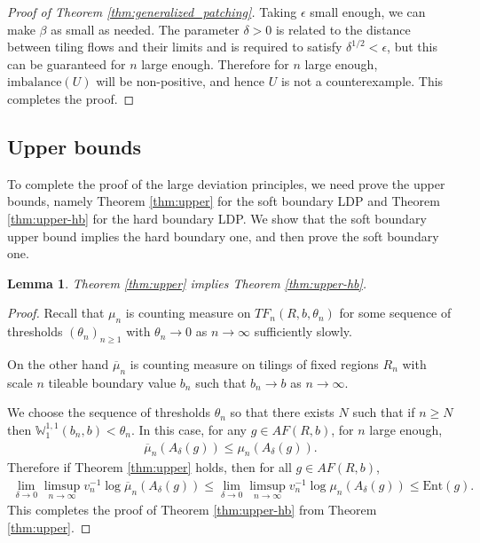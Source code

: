 \documentclass[11pt]{article}
\newtheorem{lemma}[thm]{Lemma}
\theoremstyle{remark}
\theoremstyle{definition}
\newcommand{\Ent}{\text{Ent}}
\newcommand{\m}[1]{\mathbb{#1}}
\begin{document}
\begin{proof}[Proof of Theorem \ref{thm:generalized_patching}]
    Taking $\epsilon$ small enough, we can make $\beta$ as small as needed. The parameter $\delta>0$ is related to the distance between tiling flows and their limits and is required to satisfy $\delta^{1/2}<\epsilon$, but this can be guaranteed for $n$ large enough. Therefore for $n$ large enough, $\text{imbalance}(U)$ will be non-positive, and hence $U$ is not a counterexample. This completes the proof.
\end{proof}

\subsection{Upper bounds}\label{sec:upper}

To complete the proof of the large deviation principles, we need prove the upper bounds, namely Theorem \ref{thm:upper} for the soft boundary LDP and Theorem \ref{thm:upper-hb} for the hard boundary LDP. We show that the soft boundary upper bound implies the hard boundary one, and then prove the soft boundary one.
\begin{lemma}
    Theorem \ref{thm:upper} implies Theorem \ref{thm:upper-hb}.
\end{lemma}
\begin{proof}
    Recall that $\mu_n$ is counting measure on $TF_n(R,b,\theta_n)$ for some sequence of thresholds $(\theta_n)_{n\geq 1}$ with $\theta_n\to 0$ as $n\to \infty$ sufficiently slowly.
    
    On the other hand $\overline{\mu}_n$ is counting measure on tilings of fixed regions $R_n$ with scale $n$ tileable boundary value $b_n$ such that $b_n\to b$ as $n\to \infty$.
    
    We choose the sequence of thresholds $\theta_n$ so that there exists $N$ such that if $n\geq N$ then $\m W_1^{1,1}(b_n,b)<\theta_n$. In this case, for any $g\in AF(R,b)$, for $n$ large enough,
    \begin{align*}
        \overline\mu_n(A_{\delta}( g))\leq \mu_n(A_{\delta}( g)).
    \end{align*}
    Therefore if Theorem \ref{thm:upper} holds, then for all $g\in AF(R,b)$,
    \begin{align*}
   \lim_{\delta\to 0}\limsup_{n\to \infty} v_n^{-1} \log \overline\mu_n(A_{\delta}( g))\leq \lim_{\delta\to 0}\limsup_{n\to \infty} v_n^{-1} \log \mu_n(A_{\delta}( g)) \leq \Ent( g).
\end{align*}
This completes the proof of Theorem \ref{thm:upper-hb} from Theorem \ref{thm:upper}.
\end{proof}
\end{document}
